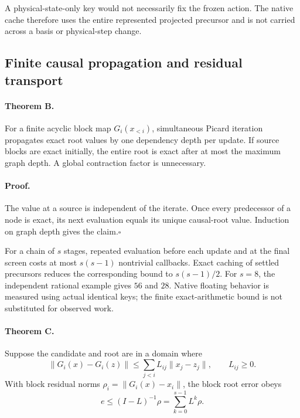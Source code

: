 A physical-state-only key would not necessarily fix the frozen action.
The native cache therefore uses the entire represented projected precursor
and is not carried across a basis or physical-step change.

\subsection{Finite causal propagation and residual transport}

\paragraph{Theorem B.}
For a finite acyclic block map $G_i(x_{<i})$, simultaneous Picard iteration
propagates exact root values by one dependency depth per update. If source
blocks are exact initially, the entire root is exact after at most the
maximum graph depth. A global contraction factor is unnecessary.

\paragraph{Proof.}
The value at a source is independent of the iterate. Once every predecessor
of a node is exact, its next evaluation equals its unique causal-root value.
Induction on graph depth gives the claim.\hfill$\square$

For a chain of $s$ stages, repeated evaluation before each update and at
the final screen costs at most $s(s-1)$ nontrivial callbacks. Exact caching
of settled precursors reduces the corresponding bound to
$s(s-1)/2$. For $s=8$, the independent rational example gives $56$ and $28$.
Native floating behavior is measured using actual identical keys; the
finite exact-arithmetic bound is not substituted for observed work.

\paragraph{Theorem C.}
Suppose the candidate and root are in a domain where
\begin{equation}
 \|G_i(x)-G_i(z)\|\le\sum_{j<i}L_{ij}\|x_j-z_j\|,
 \qquad L_{ij}\ge0.
\end{equation}
With block residual norms $\rho_i=\|G_i(x)-x_i\|$, the block root error obeys
\begin{equation}
 e\le (I-L)^{-1}\rho
   =\sum_{k=0}^{s-1}L^k\rho.\label{eq:df-causal-majorant}
\end{equation}

